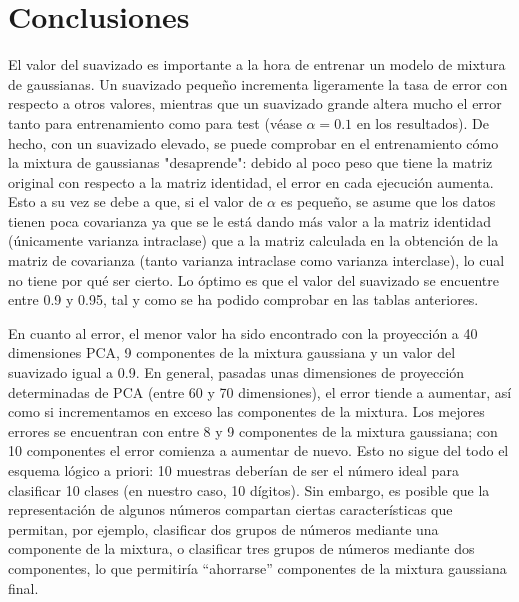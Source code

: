 \documentclass[a4paper]{article}
\begin{document}
\section{Conclusiones}
\quad El valor del suavizado es importante a la hora de entrenar un modelo de mixtura de gaussianas. Un suavizado pequeño incrementa ligeramente la tasa de error con respecto a otros valores, mientras que un suavizado grande altera mucho el error tanto para entrenamiento como para test (véase $\alpha = 0.1$ en los resultados). De hecho, con un suavizado elevado, se puede comprobar en el entrenamiento cómo la mixtura de gaussianas "desaprende": debido al poco peso que tiene la matriz original con respecto a la matriz identidad, el error en cada ejecución aumenta. Esto a su vez se debe a que, si el valor de $\alpha$ es pequeño, se asume que los datos tienen poca covarianza ya que se le está dando más valor a la matriz identidad (únicamente varianza intraclase) que a la matriz calculada en la obtención de la matriz de covarianza (tanto varianza intraclase como varianza interclase), lo cual no tiene por qué ser cierto. Lo óptimo es que el valor del suavizado se encuentre entre 0.9 y 0.95, tal y como se ha podido comprobar en las tablas anteriores.

\quad En cuanto al error, el menor valor ha sido encontrado con la proyección a 40 dimensiones PCA, 9 componentes de la mixtura gaussiana y un valor del suavizado igual a 0.9. En general, pasadas unas dimensiones de proyección determinadas de PCA (entre 60 y 70 dimensiones), el error tiende a aumentar, así como si incrementamos en exceso las componentes de la mixtura. Los mejores errores se encuentran con entre 8 y 9 componentes de la mixtura gaussiana; con 10 componentes el error comienza a aumentar de nuevo. Esto no sigue del todo el esquema lógico a priori: 10 muestras deberían de ser el número ideal para clasificar 10 clases (en nuestro caso, 10 dígitos). Sin embargo, es posible que la representación de algunos números compartan ciertas características que permitan, por ejemplo, clasificar dos grupos de números mediante una componente de la mixtura, o clasificar tres grupos de números mediante dos componentes, lo que permitiría “ahorrarse” componentes de la mixtura gaussiana final.
\end{document}
